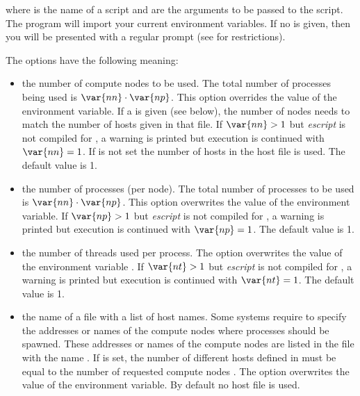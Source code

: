 where  is the name of a script and  are the arguments to
be passed to the script.
The  program will import your current environment variables. 
If no  is given, then you will be presented with a regular \PYTHON
prompt (see  for restrictions).

The options have the following meaning:
\begin{itemize}
\item[\programopt{-n} \var{nn}] the number of compute nodes  to be used.
    The total number of processes being used is $\var{nn} \cdot \var{np}$.
    This option overrides the value of the 
    environment variable. 
    If a  is given (see below), the number of nodes needs to
    match the number of hosts given in that file.
    If $\var{nn}>1$ but {\it escript} is not compiled for \MPI, a warning is
    printed but execution is continued with $\var{nn}=1$.
    If  is not set the number of hosts in the host file is
    used. The default value is 1.
 
\item[\programopt{-p} \var{np}] the number of \MPI processes (per node).
    The total number of processes to be used is $\var{nn} \cdot \var{np}$.
    This option overwrites the value of the 
    environment variable.
    If $\var{np}>1$ but {\it escript} is not compiled for \MPI, a warning is
    printed but execution is continued with $\var{np}=1$.
    The default value is 1.

\item[\programopt{-t} \var{nt}] the number of threads used per process.
    The option overwrites the value of the \OPENMP environment variable .
    If $\var{nt}>1$ but {\it escript} is not compiled for \OPENMP, a warning
    is printed but execution is continued with $\var{nt}=1$.
    The default value is 1.

\item[\programopt{-f} \var{hostfile}] the name of a file with a list of host names.
    Some systems require to specify the addresses or names of the compute
    nodes where \MPI processes should be spawned.
    These addresses or names of the compute nodes are listed in the file with
    the name .
    If  is set, the number of different hosts defined in 
    must be equal to the number of requested compute nodes .
    The option overwrites the value of the  environment
    variable. By default no host file is used.


\end{itemize}
